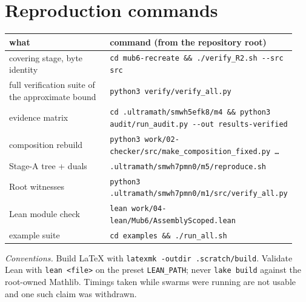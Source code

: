 \documentclass[10pt]{article}
\theoremstyle{definition}
\newcommand{\file}[1]{\texttt{\small #1}}
\begin{document}
\appendix
\section{Reproduction commands}

\begin{center}
\small
\begin{tabular}{@{}p{0.36\linewidth}p{0.58\linewidth}@{}}
\toprule
what & command (from the repository root) \\
\midrule
covering stage, byte identity & \file{cd mub6-\allowbreak{}recreate \&\& ./\allowbreak{}verify\_R2.sh -\allowbreak{}-\allowbreak{}src src} \\
full verification suite of the approximate bound & \file{python3 verify/\allowbreak{}verify\_all.py} \\
evidence matrix & \file{cd .ultramath/\allowbreak{}smwh5efk8/\allowbreak{}m4 \&\& python3 audit/\allowbreak{}run\_audit.py -\allowbreak{}-\allowbreak{}out results-\allowbreak{}verified} \\
composition rebuild & \file{python3 work/\allowbreak{}02-\allowbreak{}checker/\allowbreak{}src/\allowbreak{}make\_composition\_fixed.py \ldots} \\
Stage-A tree + duals & \file{.ultramath/\allowbreak{}smwh7pmn0/\allowbreak{}m5/\allowbreak{}reproduce.sh} \\
Root witnesses & \file{python3 .ultramath/\allowbreak{}smwh7pmn0/\allowbreak{}m1/\allowbreak{}src/\allowbreak{}verify\_all.py} \\
Lean module check & \file{lean work/\allowbreak{}04-\allowbreak{}lean/\allowbreak{}Mub6/\allowbreak{}AssemblyScoped.lean} \\
example suite & \file{cd examples \&\& ./\allowbreak{}run\_all.sh} \\
\bottomrule
\end{tabular}
\end{center}

\noindent\emph{Conventions.} Build LaTeX with \file{latexmk -\allowbreak{}outdir .scratch/\allowbreak{}build}. Validate Lean with
\file{lean <file>} on the preset \texttt{LEAN\_PATH}; never \file{lake build} against the root-owned
Mathlib. Timings taken while swarms were running are not usable and one such claim was withdrawn.
\end{document}

